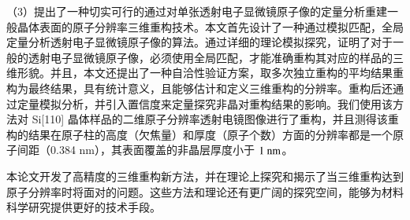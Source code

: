 {（3）提出了一种切实可行的通过对单张透射电子显微镜原子像的定量分析重建一般晶体表面的原子分辨率三维重构技术。本文首先设计了一种通过模拟匹配，全局定量分析透射电子显微镜原子像的算法。通过详细的理论模拟探究，证明了对于一般的透射电子显微镜原子像，必须使用全局匹配，才能准确重构其对应的样品的三维形貌。并且，本文还提出了一种自洽性验证方案，取多次独立重构的平均结果重构为最终结果，具有统计意义，且能够估计和定义三维重构的分辨率。重构后还通过定量模拟分析，并引入置信度来定量探究非晶对重构结果的影响。我们使用该方法对 Si[110] 晶体样品的二维原子分辨率透射电镜图像进行了重构，并且测得该重构的结果在原子柱的高度（欠焦量）和厚度（原子个数）方面的分辨率都是一个原子间距（0.384 nm），其表面覆盖的非晶层厚度小于 $\textnormal{1 nm}$。

本论文开发了高精度的三维重构新方法，并在理论上探究和揭示了当三维重构达到原子分辨率时将面对的问题。这些方法和理论还有更广阔的探究空间，能够为材料科学研究提供更好的技术手段。

}


